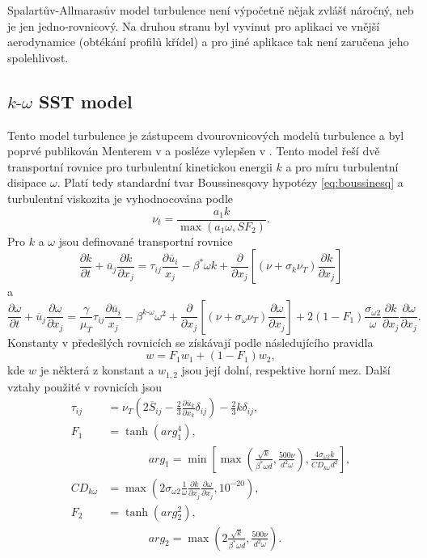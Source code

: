 Spalartův-Allmarasův model turbulence není výpočetně nějak zvlášť náročný, neb je jen jedno-rovnicový. Na druhou stranu byl vyvinut pro aplikaci ve vnější aerodynamice (obtékání profilů křídel) a pro jiné aplikace tak není zaručena jeho spolehlivost.

\subsection{$k\text{-}\omega$ SST model}

Tento model turbulence je zástupcem dvourovnicových modelů turbulence a byl poprvé publikován Menterem v \cite{menter1994two} a posléze vylepšen v \cite{menter2003ten}. Tento model řeší dvě transportní rovnice pro turbulentní kinetickou energii $ k $ a pro míru turbulentní disipace $ \omega $. Platí tedy standardní tvar Boussinesqovy hypotézy \ref{eq:boussinesq} a turbulentní viskozita je vyhodnocována podle
\begin{equation}
\nu_t = \frac{a_1 k}{\max(a_1 \omega,SF_2)}.
\end{equation}
Pro $ k $ a $\omega$ jsou definované transportní rovnice
\begin{equation}
\frac{\partial k}{\partial t} + \overline{u}_j\frac{\partial k}{\partial x_j} = \tau_{ij}\frac{\partial \overline{u}_i}{x_j} - \beta^\ast \omega k + \frac{\partial}{\partial x_j} \left[ (\nu + \sigma_k \nu_T)\frac{\partial k}{\partial x_j} \right]
\end{equation}
a
\begin{equation}
\frac{\partial \omega}{\partial t} + \overline{u}_j\frac{\partial \omega}{\partial x_j} = \frac{\gamma}{\mu_T}\tau_{ij}\frac{\partial \overline{u}_i}{x_j} - \beta^{k\text{-}\omega} \omega^2 + \frac{\partial}{\partial x_j} \left[ (\nu + \sigma_\omega \nu_T)\frac{\partial \omega}{\partial x_j} \right] + 2(1-F_1)\frac{\sigma_{\omega 2}}{\omega}\frac{\partial k}{\partial x_j}\frac{\partial \omega}{\partial x_j}.
\end{equation}
Konstanty v předešlých rovnicích se získávají podle následujícího pravidla
\begin{equation}
w = F_1 w_1 + (1-F_1)w_2,
\end{equation}
kde $ w $ je některá z konstant a $ w_{1,2} $ jsou její dolní, respektive horní mez. Další vztahy použité v rovnicích jsou
\begin{align*}
\tau_{ij} &= \nu_T \left( 2\overline{S}_{ij} - \frac{2}{3} \frac{\partial \overline{u}_k}{\partial x_k} \delta_{ij} \right) - \frac{2}{3}k\delta_{ij}, \\
F_1 &= \tanh(arg_1^4),\\   &\,\,\,\,\,\,\,\,\,\,\,\,\,\,\,\,\,\,\,\,\,\,arg_1 = \min\left[ \max \left( \frac{\sqrt{k}}{\beta^\ast \omega d}, \frac{500\nu}{d^2 \omega} \right), \frac{4 \sigma_{\omega2} k}{CD_{k\omega}d^2} \right],\\
CD_{k\omega} &= \max\left( 2 \sigma_{\omega2} \frac{1}{\omega} \frac{\partial k}{\partial x_j} \frac{\partial \omega}{\partial x_j}, 10^{-20} \right),\\
F_2 &= \tanh(arg_2^2), \\  &\,\,\,\,\,\,\,\,\,\,\,\,\,\,\,\,\,\,\,\,\,\,arg_2 = \max \left( 2\frac{\sqrt{k}}{\beta^\ast \omega d}, \frac{500\nu}{d^2 \omega} \right).
\end{align*}
